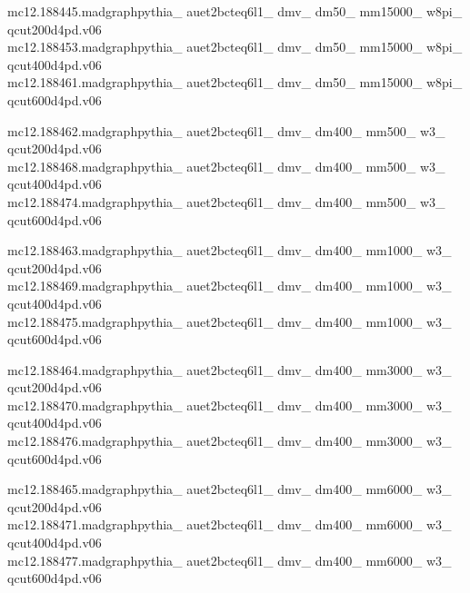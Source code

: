 mc12.188445.madgraphpythia\_ auet2bcteq6l1\_ dmv\_ dm50\_ mm15000\_ w8pi\_ \\ qcut200d4pd.v06\\
mc12.188453.madgraphpythia\_ auet2bcteq6l1\_ dmv\_ dm50\_ mm15000\_ w8pi\_ \\ qcut400d4pd.v06\\
mc12.188461.madgraphpythia\_ auet2bcteq6l1\_ dmv\_ dm50\_ mm15000\_ w8pi\_ \\ qcut600d4pd.v06

mc12.188462.madgraphpythia\_ auet2bcteq6l1\_ dmv\_ dm400\_ mm500\_ w3\_ \\ qcut200d4pd.v06\\
mc12.188468.madgraphpythia\_ auet2bcteq6l1\_ dmv\_ dm400\_ mm500\_ w3\_ \\ qcut400d4pd.v06\\
mc12.188474.madgraphpythia\_ auet2bcteq6l1\_ dmv\_ dm400\_ mm500\_ w3\_ \\ qcut600d4pd.v06

mc12.188463.madgraphpythia\_ auet2bcteq6l1\_ dmv\_ dm400\_ mm1000\_ w3\_ \\ qcut200d4pd.v06\\
mc12.188469.madgraphpythia\_ auet2bcteq6l1\_ dmv\_ dm400\_ mm1000\_ w3\_ \\ qcut400d4pd.v06\\
mc12.188475.madgraphpythia\_ auet2bcteq6l1\_ dmv\_ dm400\_ mm1000\_ w3\_ \\ qcut600d4pd.v06

mc12.188464.madgraphpythia\_ auet2bcteq6l1\_ dmv\_ dm400\_ mm3000\_ w3\_ \\ qcut200d4pd.v06\\
mc12.188470.madgraphpythia\_ auet2bcteq6l1\_ dmv\_ dm400\_ mm3000\_ w3\_ \\ qcut400d4pd.v06\\
mc12.188476.madgraphpythia\_ auet2bcteq6l1\_ dmv\_ dm400\_ mm3000\_ w3\_ \\ qcut600d4pd.v06

mc12.188465.madgraphpythia\_ auet2bcteq6l1\_ dmv\_ dm400\_ mm6000\_ w3\_ \\ qcut200d4pd.v06\\
mc12.188471.madgraphpythia\_ auet2bcteq6l1\_ dmv\_ dm400\_ mm6000\_ w3\_ \\ qcut400d4pd.v06\\
mc12.188477.madgraphpythia\_ auet2bcteq6l1\_ dmv\_ dm400\_ mm6000\_ w3\_ \\ qcut600d4pd.v06

